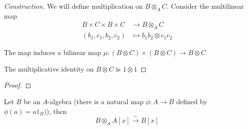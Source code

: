 \begin{proof}[Construction]
	We will define multiplication on $B \otimes_A C$. Consider the multilinear map
	\begin{align*}
		B \times C \times B \times C &\to B \otimes_A C \\
		(b_1, c_1, b_2, c_2) &\mapsto b_1 b_2 \otimes c_1 c_2
	\end{align*}
	
	The map induces a bilinear map $\mu: (B \otimes C) \times (B \otimes C) \to B \otimes C$
	\begin{center}
	\end{center}
	
	The multiplicative identity on $B \otimes C$ is $1 \otimes 1$
\end{proof}

\begin{proof}
\end{proof}

\begin{remark}
	Let $B$ be an $A$-algebra (there is a natural map $\phi: A \to B$ defined by $\phi(a) =  a 1_B)$), then
	$$
		B \otimes_A A[x] \xrightarrow{\sim} B[x]
	$$
\end{remark}

